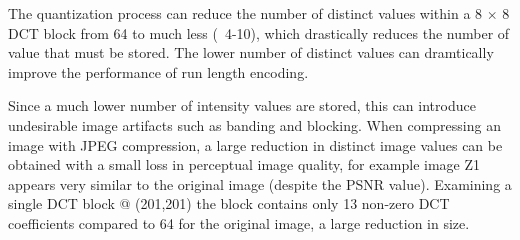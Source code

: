 The quantization process can reduce the number of distinct values within a 8 $\times$ 8 DCT block from 64 to much less (~4-10), which drastically reduces the number of value that must be stored. The lower number of distinct values can dramtically improve the performance of run length encoding.

Since a much lower number of intensity values are stored, this can introduce undesirable image artifacts such as banding and blocking. When compressing an image with JPEG compression, a large reduction in distinct image values can be obtained with a small loss in perceptual image quality, for example image Z1 appears very similar to the original image (despite the PSNR value). Examining a single DCT block @ (201,201) the block contains only 13 non-zero DCT coefficients compared to 64 for the original image, a large reduction in size.

\begin{figure}[ht]
\centering

\end{figure}

